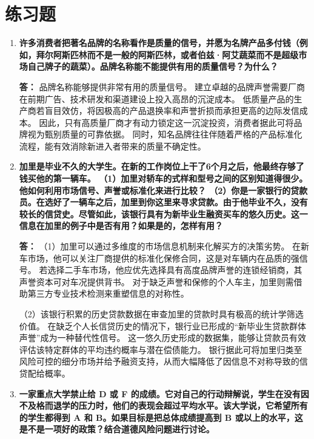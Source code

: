 	\section{练习题}
	\begin{enumerate}[label=\textbf{\arabic*.}, leftmargin=*]
		\item \textbf{许多消费者把著名品牌的名称看作是质量的信号，并愿为名牌产品多付钱（例如，拜尔阿斯匹林而不是一般的阿斯匹林，或者伯兹·阿艾蔬菜而不是超级市场自己牌子的蔬菜）。品牌名称能不能提供有用的质量信号？为什么？}
		
		\textbf{答：} 品牌名称能够提供非常有用的质量信号。
		建立卓越的品牌声誉需要厂商在前期广告、技术研发和渠道建设上投入高昂的沉淀成本。
		低质量产品的生产商若盲目效仿，将因极高的产品退换率和声誉折损而承担更高的边际发信成本。
		因此，只有高质量厂商才有动力锁定这一沉淀投资，消费者据此可将品牌视为甄别质量的可靠依据。
		同时，知名品牌往往伴随着严格的产品标准化流程，能有效消除新进入者带来的质量不确定性。
		
		\item \textbf{加里是毕业不久的大学生。在新的工作岗位上干了6个月之后，他最终存够了钱买他的第一辆车。
			（1）加里对轿车的式样和型号之间的区别知道得很少。他如何利用市场信号、声誉或标准化来进行比较？
			（2）你是一家银行的贷款员。在选好了一辆车之后，加里到你这里来寻求贷款。由于他毕业不久，没有较长的信贷史。尽管如此，该银行具有为新毕业生融资买车的悠久历史。这一信息在加里的例子中是否有用？如果是的，怎样有用？}
		
		\textbf{答：} （1）加里可以通过多维度的市场信息机制来化解买方的决策劣势。
		在新车市场，他可以关注厂商提供的标准化保修合同，这是对车辆内在品质的强信号。
		若选择二手车市场，他应优先选择具有高度品牌声誉的连锁经销商，其声誉资本可对车况提供背书。
		对于缺乏声誉和保修的个人车主，加里则需借助第三方专业技术检测来重塑信息的对称性。
		
		（2）该银行积累的历史贷款数据在审查加里的贷款时具有极高的统计学筛选价值。
		在缺乏个人长信贷历史的情况下，银行业已形成的“新毕业生贷款群体声誉”成为一种替代性信号。
		这一悠久历史形成的数据集，能够让贷款员有效评估该特定群体的平均违约概率与潜在偿债能力。
		银行据此可将加里归类至风险可控的细分市场并给予融资支持，从而大幅降低了因信息不对称导致的信贷配给概率。
		
		\item \textbf{一家重点大学禁止给 D 或 F 的成绩。它对自己的行动辩解说，学生在没有因不及格而退学的压力时，他们的表现会超过平均水平。该大学说，它希望所有的学生都得到 A 和 B。如果目标是把总体成绩提高到 B 或以上的水平，这是不是一项好的政策？结合道德风险问题进行讨论。}
		

\end{enumerate}
